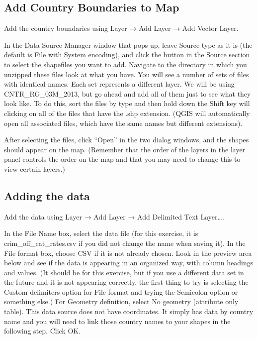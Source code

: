 \documentclass[]{book}
\begin{document}
\hypertarget{add-country-boundaries-to-map}{%
\subsection{Add Country Boundaries to Map}\label{add-country-boundaries-to-map}}

Add the country boundaries using Layer → Add Layer → Add Vector Layer.

In the Data Source Manager window that pops up, leave Source type as it is (the default is File with System encoding), and click the button in the Source section to select the shapefiles you want to add. Navigate to the directory in which you unzipped these files look at what you have. You will see a number of sets of files with identical names. Each set represents a different layer. We will be using CNTR\_RG\_03M\_2013, but go ahead and add all of them just to see what they look like. To do this, sort the files by type and then hold down the Shift key will clicking on all of the files that have the .shp extension. (QGIS will automatically open all associated files, which have the same names but different extensions).

After selecting the files, click ``Open'' in the two dialog windows, and the shapes should appear on the map. (Remember that the order of the layers in the layer panel controls the order on the map and that you may need to change this to view certain layers.)

\hypertarget{adding-the-data}{%
\subsection{Adding the data}\label{adding-the-data}}

Add the data using Layer → Add Layer → Add Delimited Text Layer\ldots{}.

In the File Name box, select the data file (for this exercise, it is crim\_off\_cat\_rates.csv if you did not change the name when saving it). In the File format box, choose CSV if it is not already chosen. Look in the preview area below and see if the data is appearing in an organized way, with column headings and values. (It should be for this exercise, but if you use a different data set in the future and it is not appearing correctly, the first thing to try is selecting the Custom delimiters option for File format and trying the Semicolon option or something else.) For Geometry definition, select No geometry (attribute only table). This data source does not have coordinates. It simply has data by country name and you will need to link those country names to your shapes in the following step. Click OK.
\end{document}
